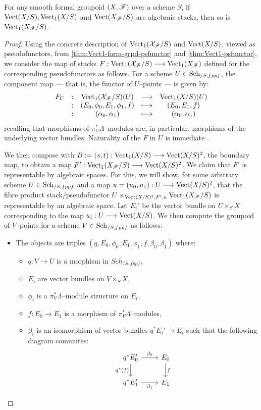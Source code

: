 \documentclass[11pt]{amsart}
\begin{document}
\begin{thm}\label{thm:Vect-alg-Vect1-alg}
For any smooth formal groupoid $(X, \mathscr{F})$ over a scheme $S$,
if $\mathrm{Vect}(X/S), \mathrm{Vect}_1(X/S)$ and $\mathrm{Vect}(X_\mathscr{F}/S)$ are algebraic stacks, then so
is $\mathrm{Vect}_1(X_\mathscr{F}/S)$.
\end{thm}
\begin{proof}
Using the concrete description of
$\mathrm{Vect}_1(\mathcal{X}_\mathscr{F}/S)$ and $\mathrm{Vect}(X/S)$, viewed as pseudofunctors,
from \cref{thm:Vect1-form-grpd-psfunctor} and \cref{thm:Vect1-psfunctor},
we consider the map of stacks
$F : \Vect_1(\mcX_\sF/S) \to \Vect_1(X_\sF)$
defined for the corresponding pseudofunctors as follows.
For a scheme $U \in \mathrm{Sch}_{/S, fppf}$, the component map --- that is, the
functor of $U$--points --- is given by:
\[\begin{array}{ccccc}
F_U & : & \Vect_1(\mcX_\sF/S)(U) & \to & \Vect_1(X/S)(U) \\
    & : & (E_0, \phi_0, E_1, \phi_1, f) & \mapsto & (E_0, E_1, f) \\
    & : & (\alpha_0, \alpha_1) & \mapsto & (\alpha_0, \alpha_1)
\end{array}\]
recalling that morphisms of $\pi_U^*\Lambda$--modules are, in particular,
morphisms of the underlying vector bundles. Naturality of the $F$
in $U$ is immediate .

We then compose with $B := (s, t) : \Vect_1(X/S) \to \Vect(X/S)^2$, the boundary
map, to obtain a map $F' : \Vect_1(X_\sF/S) \to \Vect(X/S)^2$. We claim that
$F'$ is representable by algebraic spaces. For this, we will show, for
some arbitrary scheme $U \in \mathrm{Sch}_{/S, fppf}$ and a map
$u = (u_0, u_1) : U \to \Vect(X/S)^2$, that the fibre product
stack/pseudofunctor $U \times_{\mathrm{Vect}(X/S)^2, F', u} \mathrm{Vect}_1(X_\mathscr{F}/S)$ is
representable by an algebraic space. Let $E_i'$ be the vector bundle
on $U \times_S X$ corresponding to the map $u_i : U \to \Vect(X/S)$.
We then compute the groupoid of
$V$--points for a scheme $V \in \mathrm{Sch}_{/S, fppf}$ as follows:
\begin{itemize}
\item The objects are triples
$(q, E_0, \phi_0, E_1, \phi_1, f, \beta_0, \beta_1)$ where:
  \begin{itemize}[itemsep=0pt]
  \item $q : V \to U$ is a morphism in $Sch_{/S, fppf}$,
  \item $E_i$ are vector bundles on $V \times_S X$,
  \item $\phi_i$ is a $\pi_V^*\Lambda$--module structure on $E_i$,
  \item $f : E_0 \to E_1$ is a morphism of $\pi_V^*\Lambda$--modules,
  \item $\beta_i$ is an isomorphism of vector bundles
  $q^*E_i' \to E_i$ such that the following diagram commutes:
  \[\begin{tikzcd}
  q^*E_0' \ar[r, "\beta_0"] \ar[d, "q^*(f)" left] &
  E_0 \ar[d, "f"] \\
  q^*E_1' \ar[r, "\beta_1" below] & E_1
  \end{tikzcd}\]
  \end{itemize}


\end{itemize}
\end{proof}
\end{document}
